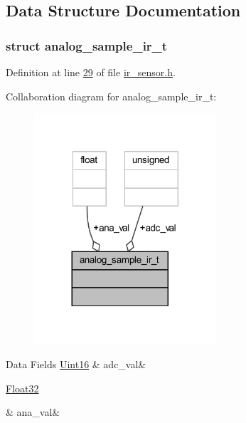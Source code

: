 \subsection{Data Structure Documentation}
\label{d1/dd6/a00108}
\hypertarget{a00017_d1/dd6/a00108}{}
\subsubsection{struct analog\+\_\+sample\+\_\+ir\+\_\+t}


Definition at line \hyperlink{a00017_source_l00029}{29} of file \hyperlink{a00017_source}{ir\+\_\+sensor.\+h}.



Collaboration diagram for analog\+\_\+sample\+\_\+ir\+\_\+t\+:\nopagebreak
\begin{figure}[H]
\begin{center}
\leavevmode
\includegraphics[width=192pt]{d7/d12/a00911}
\end{center}
\end{figure}
\begin{DoxyFields}{Data Fields}
\hypertarget{a00017_a891d4fcb12960785cecc1e688681b748}{\hyperlink{a00072_a59a9f6be4562c327cbfb4f7e8e18f08b}{Uint16}}\label{a00017_a891d4fcb12960785cecc1e688681b748}
&
adc\+\_\+val&
\\
\hline

\hypertarget{a00017_a053a8ae0e59f7414929cd8ac3feeec7b}{\hyperlink{a00072_a87d38f886e617ced2698fc55afa07637}{Float32}}\label{a00017_a053a8ae0e59f7414929cd8ac3feeec7b}
&
ana\+\_\+val&
\\
\hline

\end{DoxyFields}
\label{d9/dbb/a00852}
\hypertarget{a00017_d9/dbb/a00852}{}
